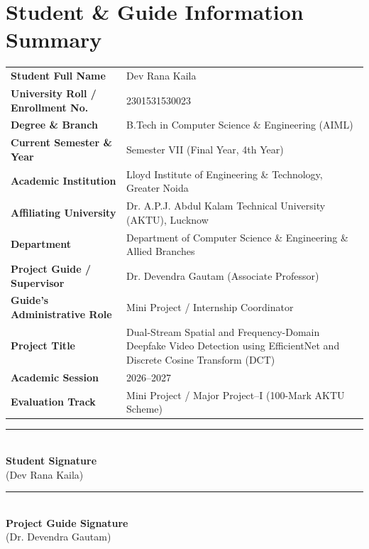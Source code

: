 \documentclass[12pt,a4paper]{report}
\begin{document}
\newpage

\chapter*{Student \& Guide Information Summary}
\thispagestyle{plain}

\begin{table}[htbp]
\centering
\begin{tabular}{p{5.5cm} p{9.0cm}}
\toprule
\textbf{Student Full Name} & Dev Rana Kaila \\
\textbf{University Roll / Enrollment No.} & 2301531530023 \\
\textbf{Degree \& Branch} & B.Tech in Computer Science \& Engineering (AIML) \\
\textbf{Current Semester \& Year} & Semester VII (Final Year, 4th Year) \\
\textbf{Academic Institution} & Lloyd Institute of Engineering \& Technology, Greater Noida \\
\textbf{Affiliating University} & Dr. A.P.J. Abdul Kalam Technical University (AKTU), Lucknow \\
\textbf{Department} & Department of Computer Science \& Engineering \& Allied Branches \\
\textbf{Project Guide / Supervisor} & Dr. Devendra Gautam (Associate Professor) \\
\textbf{Guide's Administrative Role} & Mini Project / Internship Coordinator \\
\textbf{Project Title} & Dual-Stream Spatial and Frequency-Domain Deepfake Video Detection using EfficientNet and Discrete Cosine Transform (DCT) \\
\textbf{Academic Session} & 2026--2027 \\
\textbf{Evaluation Track} & Mini Project / Major Project--I (100-Mark AKTU Scheme) \\
\bottomrule
\end{tabular}
\end{table}

\vspace{3.5cm}
\noindent
\begin{minipage}[t]{0.45\textwidth}
    \rule{6cm}{0.4pt}\\[0.2cm]
    \textbf{Student Signature}\\
    (Dev Rana Kaila)
\end{minipage}
\hfill
\begin{minipage}[t]{0.45\textwidth}
    \raggedleft
    \rule{6cm}{0.4pt}\\[0.2cm]
    \textbf{Project Guide Signature}\\
    (Dr. Devendra Gautam)
\end{minipage}
\end{document}
